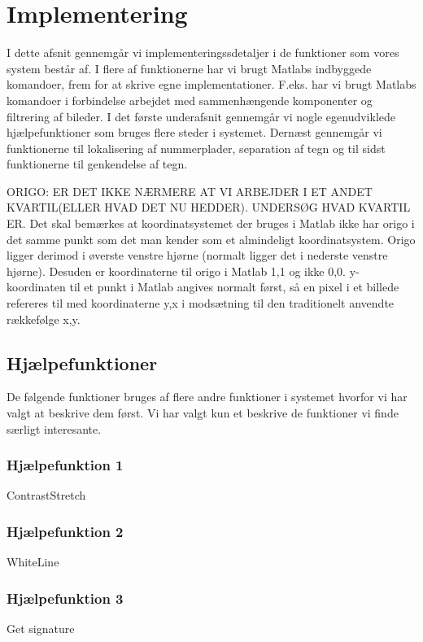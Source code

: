 \section{Implementering}
\label{sec:implementation}

I dette afsnit gennemgår vi implementeringssdetaljer i de funktioner som vores system består af. I flere af funktionerne har vi brugt Matlabs indbyggede komandoer, frem for at skrive egne implementationer. F.eks. har vi brugt Matlabs komandoer i forbindelse arbejdet med sammenhængende komponenter og filtrering af bileder. I det første underafsnit gennemgår vi nogle egenudviklede hjælpefunktioner som bruges flere steder i systemet. Dernæst gennemgår vi funktionerne til lokalisering af nummerplader, separation af tegn og til sidst funktionerne til genkendelse af tegn.

ORIGO: ER DET IKKE NÆRMERE AT VI ARBEJDER I ET ANDET KVARTIL(ELLER HVAD DET NU HEDDER). UNDERSØG HVAD KVARTIL ER.
Det skal bemærkes at koordinatsystemet der bruges i Matlab ikke har origo i det samme punkt som det man kender som et almindeligt koordinatsystem. Origo ligger derimod i øverste venstre hjørne (normalt ligger det i nederste venstre hjørne). Desuden er koordinaterne til origo i Matlab 1,1 og ikke 0,0. y-koordinaten til et punkt i Matlab angives normalt først, så en pixel i et billede refereres til med koordinaterne y,x i modsætning til den traditionelt anvendte rækkefølge x,y.


\subsection{Hjælpefunktioner}
\label{sec:imp:hjaelpefunktioner}
De følgende funktioner bruges af flere andre funktioner i systemet hvorfor vi har valgt at beskrive dem først. Vi har valgt kun et beskrive de funktioner vi finde særligt interesante.

\subsubsection{Hjælpefunktion 1}
\label{sec:imp:ContrastStrech}
ContrastStretch
\subsubsection{Hjælpefunktion 2}
WhiteLine 
\subsubsection{Hjælpefunktion 3}
\label{sec:imp:GetSignature}
Get signature
